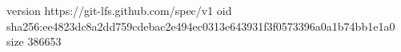 version https://git-lfs.github.com/spec/v1
oid sha256:ee4823dc8a2dd759cdebac2e494ec0313e643931f3f0573396a0a1b74bb1e1a0
size 386653
